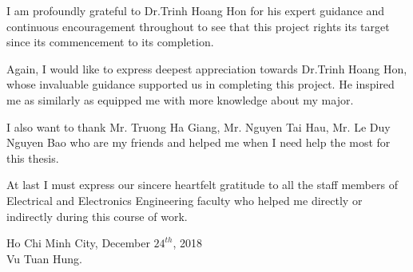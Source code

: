 I am profoundly grateful to Dr.Trinh Hoang Hon for his expert guidance and continuous encouragement throughout to see that this project rights its target since its commencement to its completion.

Again, I would like to express deepest appreciation towards Dr.Trinh Hoang Hon, whose invaluable guidance supported us in completing this project. He inspired me as similarly as equipped me with more knowledge about my major.

I also want to thank Mr. Truong Ha Giang, Mr. Nguyen Tai Hau, Mr. Le Duy Nguyen Bao who are my friends and helped me when I need help the most for this thesis.

At last I must express our sincere heartfelt gratitude to all the staff members of Electrical and Electronics Engineering faculty who helped me directly or indirectly during this course of work.

\begin{flushright}
    Ho Chi Minh City, December $24^{th}$, 2018\\
    Vu Tuan Hung.
\end{flushright}